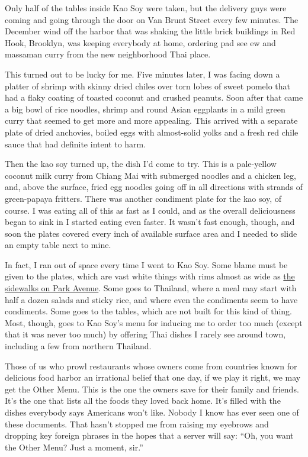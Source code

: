 Only half of the tables inside Kao Soy were taken, but the delivery guys
were coming and going through the door on Van Brunt Street every few
minutes. The December wind off the harbor that was shaking the little
brick buildings in Red Hook, Brooklyn, was keeping everybody at home,
ordering pad see ew and massaman curry from the new neighborhood Thai
place.

This turned out to be lucky for me. Five minutes later, I was facing
down a platter of shrimp with skinny dried chiles over torn lobes of
sweet pomelo that had a flaky coating of toasted coconut and crushed
peanuts. Soon after that came a big bowl of rice noodles, shrimp and
round Asian eggplants in a mild green curry that seemed to get more and
more appealing. This arrived with a separate plate of dried anchovies,
boiled eggs with almost-solid yolks and a fresh red chile sauce that had
definite intent to harm.

Then the kao soy turned up, the dish I'd come to try. This is a
pale-yellow coconut milk curry from Chiang Mai with submerged noodles
and a chicken leg, and, above the surface, fried egg noodles going off
in all directions with strands of green-papaya fritters. There was
another condiment plate for the kao soy, of course. I was eating all of
this as fast as I could, and as the overall deliciousness began to sink
in I started eating even faster. It wasn't fast enough, though, and soon
the plates covered every inch of available surface area and I needed to
slide an empty table next to mine.

In fact, I ran out of space every time I went to Kao Soy. Some blame
must be given to the plates, which are vast white things with rims
almost as wide as
\href{http://stuffnobodycaresabout.com/2012/11/30/all-new-york-city-sidewalks-are-not-created-equal/}{the
sidewalks on Park Avenue}. Some goes to Thailand, where a meal may start
with half a dozen salads and sticky rice, and where even the condiments
seem to have condiments. Some goes to the tables, which are not built
for this kind of thing. Most, though, goes to Kao Soy's menu for
inducing me to order too much (except that it was never too much) by
offering Thai dishes I rarely see around town, including a few from
northern Thailand.

Those of us who prowl restaurants whose owners come from countries known
for delicious food harbor an irrational belief that one day, if we play
it right, we may get the Other Menu. This is the one the owners save for
their family and friends. It's the one that lists all the foods they
loved back home. It's filled with the dishes everybody says Americans
won't like. Nobody I know has ever seen one of these documents. That
hasn't stopped me from raising my eyebrows and dropping key foreign
phrases in the hopes that a server will say: ``Oh, you want the Other
Menu? Just a moment, sir.''

